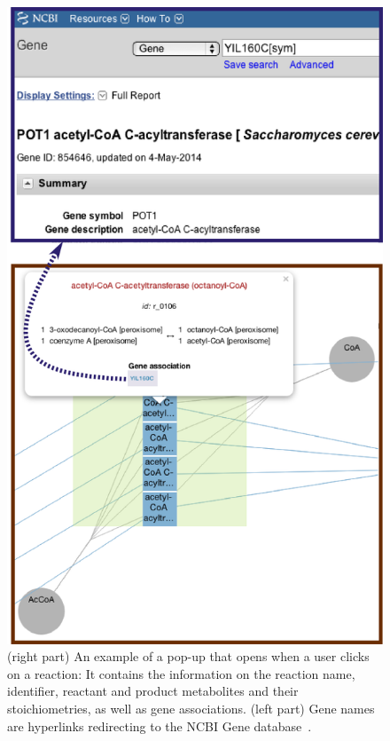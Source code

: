 \documentclass{bmcart}
\begin{document}
\begin{backmatter}
\begin{figure}[h!]
\includegraphics[scale=0.54]{figure3.png}
  \caption{
  \label{fig:pop_up}
      (right part) An example of a pop-up that opens when a user clicks on a reaction: It contains the information on the reaction name, identifier, reactant and product metabolites and their stoichiometries, as well as gene associations. (left part) Gene names are hyperlinks redirecting to the NCBI Gene database~\cite{NCBI}.}
      \end{figure}
      

\end{backmatter}
\end{document}
